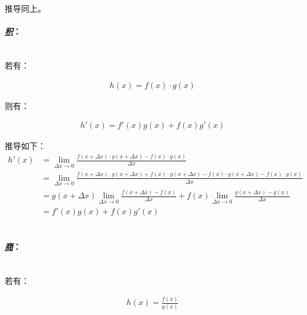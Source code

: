 推导同上。

\paragraph{\textbf{\emph{\underline{积}}}：}

\quad \\

若有：

\begin{equation*}
\begin{aligned}
h(x) = f(x) \cdot g(x)
\end{aligned}
\end{equation*}

则有：

\begin{equation*}
\begin{aligned}
h'(x) = f'(x)g(x) + f(x)g'(x)
\end{aligned}
\end{equation*}

推导如下：\\

\begin{equation*}
\begin{aligned}
h'(x) & = \lim_{\Delta x \to 0}\frac{f(x + \Delta x) \cdot g(x + \Delta x) - f(x) \cdot g(x)}{\Delta x}\\
& = \lim_{\Delta x \to 0}\frac{f(x + \Delta x) \cdot g(x + \Delta x) + f(x) \cdot g(x + \Delta x) - f(x) \cdot g(x + \Delta x) - f(x) \cdot g(x)}{\Delta x}\\
& = g(x + \Delta x)\lim_{\Delta x \to 0}\frac{f(x + \Delta x) - f(x)}{\Delta x} + f(x)\lim_{\Delta x \to 0}\frac{g(x + \Delta x) - g(x)}{\Delta x}\\
& = f'(x)g(x) + f(x)g'(x)
\end{aligned}
\end{equation*}
\\
\paragraph{\textbf{\emph{\underline{商}}}：}

\quad \\

若有：

\begin{equation*}
\begin{aligned}
h(x) = \frac{f(x)}{g(x)}
\end{aligned}
\end{equation*}

